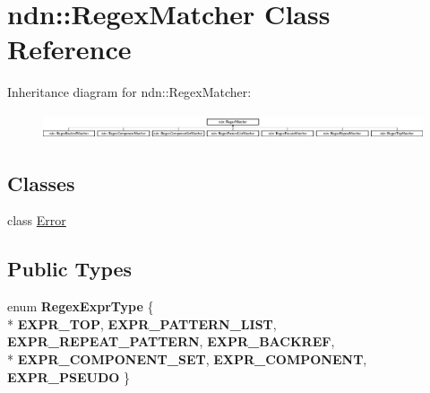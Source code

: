 \hypertarget{classndn_1_1RegexMatcher}{}\section{ndn\+:\+:Regex\+Matcher Class Reference}
\label{classndn_1_1RegexMatcher}
Inheritance diagram for ndn\+:\+:Regex\+Matcher\+:\begin{figure}[H]
\begin{center}
\leavevmode
\includegraphics[height=0.761905cm]{classndn_1_1RegexMatcher}
\end{center}
\end{figure}
\subsection*{Classes}
\begin{DoxyCompactItemize}
\item 
class \hyperlink{classndn_1_1RegexMatcher_1_1Error}{Error}
\end{DoxyCompactItemize}
\subsection*{Public Types}
\begin{DoxyCompactItemize}
\item 
enum {\bfseries Regex\+Expr\+Type} \{ \\*
{\bfseries E\+X\+P\+R\+\_\+\+T\+OP}, 
{\bfseries E\+X\+P\+R\+\_\+\+P\+A\+T\+T\+E\+R\+N\+\_\+\+L\+I\+ST}, 
{\bfseries E\+X\+P\+R\+\_\+\+R\+E\+P\+E\+A\+T\+\_\+\+P\+A\+T\+T\+E\+RN}, 
{\bfseries E\+X\+P\+R\+\_\+\+B\+A\+C\+K\+R\+EF}, 
\\*
{\bfseries E\+X\+P\+R\+\_\+\+C\+O\+M\+P\+O\+N\+E\+N\+T\+\_\+\+S\+ET}, 
{\bfseries E\+X\+P\+R\+\_\+\+C\+O\+M\+P\+O\+N\+E\+NT}, 
{\bfseries E\+X\+P\+R\+\_\+\+P\+S\+E\+U\+DO}
 \}\hypertarget{classndn_1_1RegexMatcher_a2f2f224ea8b917e174647c3f4c4d619d}{}\label{classndn_1_1RegexMatcher_a2f2f224ea8b917e174647c3f4c4d619d}

\end{DoxyCompactItemize}
